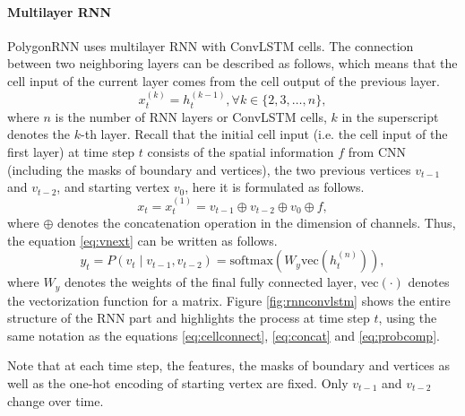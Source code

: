 \paragraph{Multilayer RNN}
PolygonRNN uses multilayer RNN with ConvLSTM cells. The connection between two neighboring layers can be described as follows, which means that the cell input of the current layer comes from the cell output of the previous layer.
\begin{equation}\label{eq:cellconnect}
	x_t^{(k)} = h_t^{(k-1)}, \forall k \in \{2,3,\ldots,n\},
\end{equation}
where $n$ is the number of RNN layers or ConvLSTM cells, $k$ in the superscript denotes the $k$-th layer. Recall that the initial cell input (i.e. the cell input of the first layer) at time step $t$ consists of the spatial information $f$ from CNN (including the masks of boundary and vertices), the two previous vertices $v_{t-1}$ and $v_{t-2}$, and starting vertex $v_0$, here it is formulated as follows.
\begin{equation}\label{eq:concat}
	x_t = x_t^{(1)} = v_{t-1} \oplus v_{t-2} \oplus v_0 \oplus f,
\end{equation}
where $\oplus$ denotes the concatenation operation in the dimension of channels. Thus, the equation \ref{eq:vnext} can be written as follows.
\begin{equation}\label{eq:probcomp}
	y_t = P(v_t \mid v_{t-1}, v_{t-2}) = \text{softmax}(W_y\text{vec}(h_t^{(n)})),
\end{equation}
where $W_y$ denotes the weights of the final fully connected layer, $\text{vec}(\cdot)$ denotes the vectorization function for a matrix. Figure \ref{fig:rnnconvlstm} shows the entire structure of the RNN part and highlights the process at time step $t$, using the same notation as the equations \ref{eq:cellconnect}, \ref{eq:concat} and \ref{eq:probcomp}.

Note that at each time step, the features, the masks of boundary and vertices as well as the one-hot encoding of starting vertex are fixed. Only $v_{t-1}$ and $v_{t-2}$ change over time.

